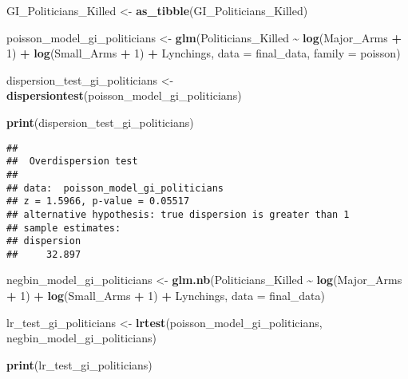 \documentclass[
  11pt,
]{article}
\newenvironment{Shaded}{\begin{snugshade}}{\end{snugshade}}
\newcommand{\AttributeTok}[1]{\textcolor[rgb]{0.13,0.29,0.53}{#1}}
\newcommand{\DecValTok}[1]{\textcolor[rgb]{0.00,0.00,0.81}{#1}}
\newcommand{\FunctionTok}[1]{\textcolor[rgb]{0.13,0.29,0.53}{\textbf{#1}}}
\newcommand{\NormalTok}[1]{#1}
\newcommand{\OtherTok}[1]{\textcolor[rgb]{0.56,0.35,0.01}{#1}}
\newcommand{\SpecialCharTok}[1]{\textcolor[rgb]{0.81,0.36,0.00}{\textbf{#1}}}
\begin{document}
\begin{Shaded}
\begin{Highlighting}[]
\NormalTok{GI\_Politicians\_Killed }\OtherTok{\textless{}{-}} \FunctionTok{as\_tibble}\NormalTok{(GI\_Politicians\_Killed)}

\NormalTok{poisson\_model\_gi\_politicians }\OtherTok{\textless{}{-}} \FunctionTok{glm}\NormalTok{(Politicians\_Killed }\SpecialCharTok{\textasciitilde{}} \FunctionTok{log}\NormalTok{(Major\_Arms }\SpecialCharTok{+} \DecValTok{1}\NormalTok{) }\SpecialCharTok{+} \FunctionTok{log}\NormalTok{(Small\_Arms }\SpecialCharTok{+} \DecValTok{1}\NormalTok{) }\SpecialCharTok{+}\NormalTok{ Lynchings, }
                                    \AttributeTok{data =}\NormalTok{ final\_data, }\AttributeTok{family =}\NormalTok{ poisson)}

\NormalTok{dispersion\_test\_gi\_politicians }\OtherTok{\textless{}{-}} \FunctionTok{dispersiontest}\NormalTok{(poisson\_model\_gi\_politicians)}

\FunctionTok{print}\NormalTok{(dispersion\_test\_gi\_politicians)}
\end{Highlighting}
\end{Shaded}

\begin{verbatim}
## 
##  Overdispersion test
## 
## data:  poisson_model_gi_politicians
## z = 1.5966, p-value = 0.05517
## alternative hypothesis: true dispersion is greater than 1
## sample estimates:
## dispersion 
##     32.897
\end{verbatim}

\begin{Shaded}
\begin{Highlighting}[]
\NormalTok{negbin\_model\_gi\_politicians }\OtherTok{\textless{}{-}} \FunctionTok{glm.nb}\NormalTok{(Politicians\_Killed }\SpecialCharTok{\textasciitilde{}} \FunctionTok{log}\NormalTok{(Major\_Arms }\SpecialCharTok{+} \DecValTok{1}\NormalTok{) }\SpecialCharTok{+} \FunctionTok{log}\NormalTok{(Small\_Arms }\SpecialCharTok{+} \DecValTok{1}\NormalTok{) }\SpecialCharTok{+}\NormalTok{ Lynchings, }
                                      \AttributeTok{data =}\NormalTok{ final\_data)}

\NormalTok{lr\_test\_gi\_politicians }\OtherTok{\textless{}{-}} \FunctionTok{lrtest}\NormalTok{(poisson\_model\_gi\_politicians, negbin\_model\_gi\_politicians)}

\FunctionTok{print}\NormalTok{(lr\_test\_gi\_politicians)}
\end{Highlighting}
\end{Shaded}
\end{document}
